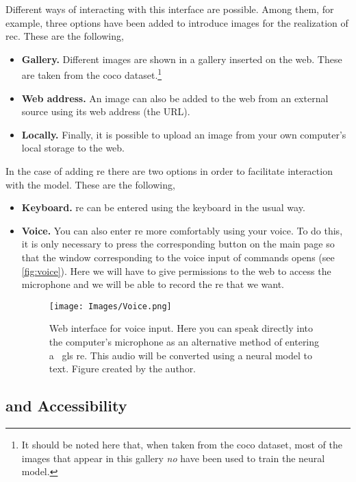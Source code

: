 Different ways of interacting with this interface are possible. Among them, for
example, three options have been added to introduce images for the realization
of \gls{rec}. These are the following,
\begin{itemize}
  \item \textbf{Gallery.} Different images are shown in a gallery inserted on
  the web. These are taken from the \gls{coco} dataset.\footnote{It should be
    noted here that, when taken from the \gls{coco} dataset, most of the images
    that appear in this gallery \emph{no} have been used to train the neural
    model.}
  \item \textbf{Web address.} An image can also be added to the web from an
  external source using its web address (the URL).
  \item \textbf{Locally.} Finally, it is possible to upload an image from your
  own computer's local storage to the web.
\end{itemize}

In the case of adding \gls{re} there are two options in order to facilitate
interaction with the model. These are the following,
\begin{itemize}
  \item \textbf{Keyboard.} \gls{re} can be entered using the keyboard in the
  usual way.
  \item \textbf{Voice.} You can also enter \gls{re} more comfortably using your
  voice. To do this, it is only necessary to press the corresponding button on
  the main page so that the window corresponding to the voice input of commands
  opens (see \vref{fig:voice}). Here we will have to give permissions to the
  web to access the microphone and we will be able to record the \gls{re} that
  we want.
  \begin{figure}[ht]
    \centering
    \texttt{[image: Images/Voice.png]}
    \caption[Web interface for voice input]{Web interface for voice input. Here
      you can speak directly into the computer's microphone as an alternative
      method of entering a \ gls {re}. This audio will be converted using a
      neural model to text. Figure created by the author.}\label{fig:voice}
  \end{figure}
\end{itemize}


\subsection{ and Accessibility}%

